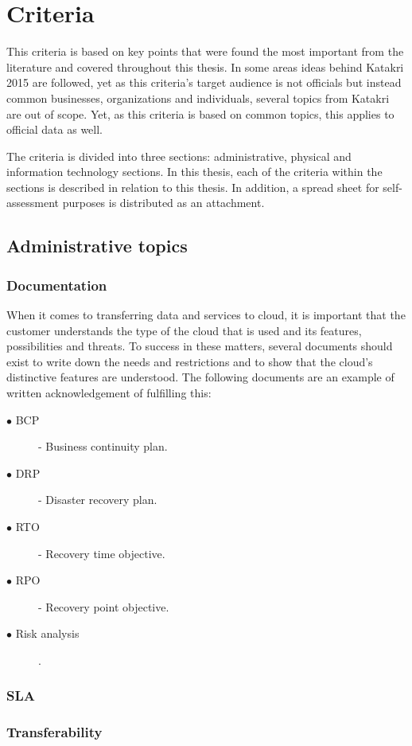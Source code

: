 \documentclass{article}
\begin{document}
\section{Criteria}
This criteria is based on key points that were found the most important from the literature and covered throughout this thesis. In some areas ideas behind Katakri 2015 are followed, yet as this criteria's target audience is not officials but instead common businesses, organizations and individuals, several topics from Katakri are out of scope. Yet, as this criteria is based on common topics, this applies to official data as well.
\par
The criteria is divided into three sections: administrative, physical and information technology sections. In this thesis, each of the criteria within the sections is described in relation to this thesis. In addition, a spread sheet for self-assessment purposes is distributed as an attachment.
\subsection{Administrative topics}

\subsubsection{Documentation}
When it comes to transferring data and services to cloud, it is important that the customer understands the type of the cloud that is used and its features, possibilities and threats. To success in these matters, several documents should exist to write down the needs and restrictions and to show that the cloud's distinctive features are understood. The following documents are an example of written acknowledgement of fulfilling this:
\begin{description}
	\item[$\bullet$ BCP] - Business continuity plan.
	\item[$\bullet$ DRP] - Disaster recovery plan.
	\item[$\bullet$ RTO] - Recovery time objective.
	\item[$\bullet$ RPO] - Recovery point objective.
	\item[$\bullet$ Risk analysis].
\end{description}
\subsubsection{SLA}
\subsubsection{Transferability}
\end{document}
